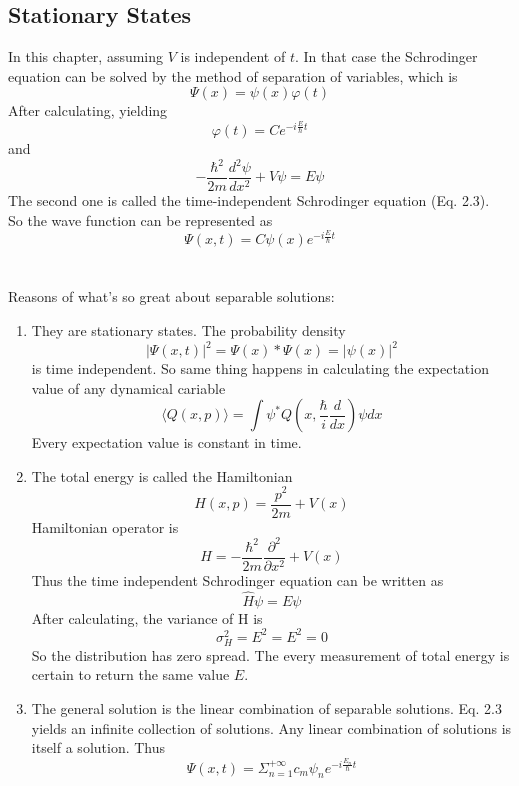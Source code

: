 \documentclass{article}
\numberwithin{equation}{section}
\begin{document}
\subsection{Stationary States}
In this chapter, assuming $V$ is independent of $t$. In that case the Schrodinger equation can be solved by the method of separation of variables, which is
\begin{equation}
	\Psi(x)=\psi(x)\varphi(t)
\end{equation}
After calculating, yielding
\begin{equation}
	\varphi(t)=Ce^{-i\frac{E}{\hbar}t}
\end{equation}
and
\begin{equation}
	-\frac{\hbar^2}{2m}\frac{d^2\psi}{dx^2}+V\psi=E\psi
\end{equation}
The second one is called the time-independent Schrodinger equation (Eq. 2.3).\\
So the wave function can be represented as
\begin{equation}
	\Psi(x,t)=C\psi(x)e^{-i\frac{E}{\hbar}t}
\end{equation}
\\
\\
Reasons of what's so great about separable solutions:\\
\begin{enumerate}
	\item They are stationary states. The probability density 
\begin{equation}
	|\Psi(x,t)|^2=\Psi(x)*\Psi(x)=|\psi(x)|^2
\end{equation}
is time independent. So same thing happens in calculating the expectation value of any dynamical cariable
\begin{equation}
	\langle Q(x,p)\rangle=\int\psi^*Q(x,\frac{\hbar}{i}\frac{d}{dx})\psi dx
\end{equation}
Every expectation value is constant in time.
	\item The total energy is called the Hamiltonian
\begin{equation}
	H(x,p)=\frac{p^2}{2m}+V(x)
\end{equation}
Hamiltonian operator is
\begin{equation}
	\hat{H}=-\frac{\hbar^2}{2m}\frac{\partial^2}{\partial x^2}+V(x)
\end{equation}
Thus the time independent Schrodinger equation can be written as
\begin{equation}
	\hat{H}\psi=E\psi
\end{equation}
After calculating, the variance of H is
\begin{equation}
	\sigma_H^2=E^2=E^2=0
\end{equation}
So the distribution has zero spread. The every measurement of total energy is certain to return the same value $E$.
	\item The general solution is the linear combination of separable solutions. Eq. 2.3 yields an infinite collection of solutions. Any linear combination of solutions is itself a solution. Thus
\begin{equation}
	\Psi(x,t)=\Sigma_{n=1}^{+\infty}c_m\psi_ne^{-i\frac{E_n}{\hbar}t}
\end{equation}
\end{enumerate}
\end{document}
